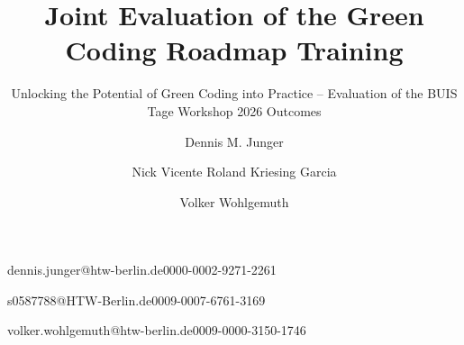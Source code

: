 \documentclass[english]{lni}
\begin{document}
\title{Joint Evaluation of the Green Coding Roadmap Training}
 \subtitle{Unlocking the Potential of Green Coding into Practice – Evaluation of the BUIS Tage Workshop 2026 Outcomes} %

\author[1]{Dennis M. Junger}{dennis.junger@htw-berlin.de}{0000-0002-9271-2261}
\author[1]{Nick Vicente Roland Kriesing Garcia}{s0587788@HTW-Berlin.de}{0009-0007-6761-3169}
\author[1]{Volker Wohlgemuth}{volker.wohlgemuth@htw-berlin.de}{0009-0000-3150-1746}
%
\maketitle
\end{document}
